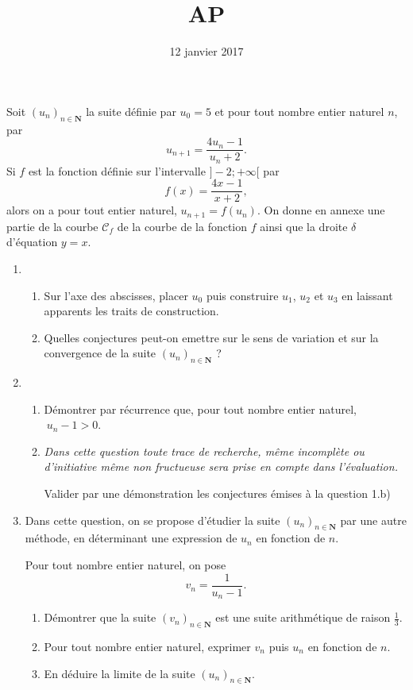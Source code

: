 \documentclass[a4paper,12pt,french]{article}
\title{AP}
\date{12 janvier 2017}
\newcommand{\N}{\mathbf{N}}
\begin{document}
\maketitle

\begin{Exercise}[number=1]
  Soit $(u_n)_{n\in\N}$ la suite définie par $u_0 = 5$ et pour tout
  nombre entier naturel $n$, par \[u_{n+1} = \frac{4u_n - 1}{u_n+2}.\]
  Si $f$ est la fonction définie sur l'intervalle $]-2;+\infty[$ par \[
  f(x) = \frac{4x -1}{x+2}, \] alors on a pour tout entier naturel,
  $u_{n+1} = f(u_n)$. On donne en annexe une partie de la courbe
  $\mathcal{C}_f$ de la courbe de la fonction $f$ ainsi que la droite
  $\delta$ d'équation $y=x$.

  \begin{enumerate}
    \item \begin{enumerate}
        \item Sur l'axe des abscisses, placer $u_0$ puis construire
          $u_1$, $u_2$ et $u_3$ en laissant apparents les traits de
          construction.
        \item Quelles conjectures peut-on emettre sur le sens de
          variation et sur la convergence de la suite $(u_n)_{n\in\N}$ ?
      \end{enumerate}
    \item \begin{enumerate}
        \item Démontrer par récurrence que, pour tout nombre entier
          naturel, $\ u_n -1 > 0$.

        \item \emph{Dans cette question toute trace de recherche, même
            incomplète ou d'initiative même non fructueuse sera prise en
          compte dans l'évaluation.}

          Valider par une démonstration les conjectures émises à la
          question 1.b)
      \end{enumerate}
    \item Dans cette question, on se propose d'étudier la suite
      $(u_n)_{n\in\N}$ par une autre méthode, en déterminant une
      expression de $u_n$ en fonction de $n$.

      Pour tout nombre entier naturel, on pose \[ v_n = \frac1{u_n -1}.
      \]
      \begin{enumerate}
        \item Démontrer que la suite $(v_n)_{n\in\N}$ est une suite
          arithmétique de raison $\frac13$.

        \item Pour tout nombre entier naturel, exprimer $v_n$ puis $u_n$
          en fonction de $n$.

        \item En déduire la limite de la suite $(u_n)_{n\in\N}$.
      \end{enumerate}
  \end{enumerate}

\end{Exercise}
\end{document}
